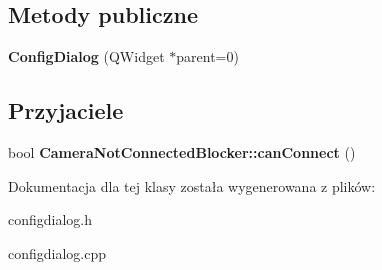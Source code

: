 \subsection*{Metody publiczne}
\begin{DoxyCompactItemize}
\item 
\hypertarget{class_config_dialog_ad16df8ed2e55bd5cc55e3ef9040b8b93}{
{\bfseries ConfigDialog} (QWidget $\ast$parent=0)}
\label{class_config_dialog_ad16df8ed2e55bd5cc55e3ef9040b8b93}

\end{DoxyCompactItemize}
\subsection*{Przyjaciele}
\begin{DoxyCompactItemize}
\item 
\hypertarget{class_config_dialog_a3b0963bb150b18a9cbd3b46187f7ea26}{
bool {\bfseries CameraNotConnectedBlocker::canConnect} ()}
\label{class_config_dialog_a3b0963bb150b18a9cbd3b46187f7ea26}

\end{DoxyCompactItemize}


Dokumentacja dla tej klasy została wygenerowana z plików:\begin{DoxyCompactItemize}
\item 
configdialog.h\item 
configdialog.cpp\end{DoxyCompactItemize}

